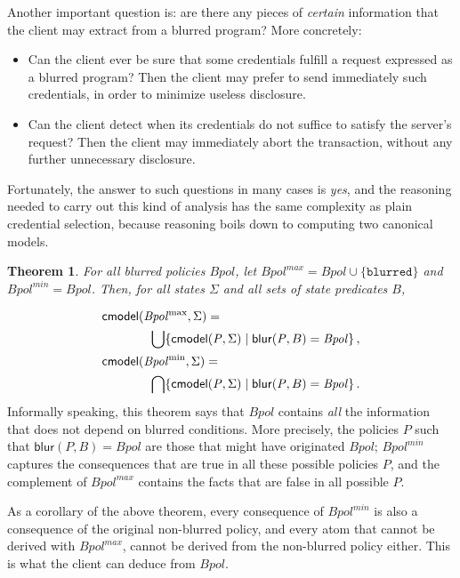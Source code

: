 \documentclass{article}
\newtheorem{theorem}{Theorem}
\newcommand{\m}[1]{\ensuremath{\mathsf{#1}}}
\newcommand{\s}[1]{\ensuremath{\mathtt{#1}}}
\newcommand{\x}[1]{\ensuremath{\mathit{#1}}}
\begin{document}
Another important question is: are there any pieces of \emph{certain}
information that the client may extract from a blurred program?  More
concretely:
\begin{itemize}
\item Can the client ever be sure that some credentials
fulfill a request expressed as a blurred program?  Then the client
may prefer to send immediately such credentials, in order to minimize
useless disclosure.

\item Can the client detect when its credentials do not suffice to
satisfy the server's request?  Then the client may immediately abort
the transaction, without any further unnecessary disclosure.
\end{itemize}
Fortunately, the answer to such questions in many cases is \emph{yes},
and the reasoning needed to carry out this kind of analysis has the
same complexity as plain credential selection, because reasoning boils
down to computing two canonical models.

\begin{theorem}                         \label{blurring-ok}
For all blurred policies \x{Bpol}, let \x{Bpol^{\max} = Bpol \cup
\{\s{blurred}\}} and \x{Bpol^{\min} = Bpol}.  Then, for all states
$\Sigma$ and all sets of state predicates $B$,
\end{theorem}
\begin{eqnarray*}
\m{cmodel} \lefteqn{  (\x{Bpol^{\max}},\Sigma) =  }\\
& & \bigcup \{ \m{cmodel}(\x{P},\Sigma) \mid 
\m{blur}(\x{P},B) =  \x{Bpol} \} \,,
\nonumber
\\
\m{cmodel} \lefteqn{  (\x{Bpol^{\min}},\Sigma) =  }\\
& & \bigcap \{ \m{cmodel}(\x{P},\Sigma) \mid 
\m{blur}(\x{P},B) =  \x{Bpol} \} \,.
\nonumber
\end{eqnarray*}
Informally speaking, this theorem says that \x{Bpol} contains
\emph{all} the information that does not depend on blurred conditions.
More precisely, the policies $P$ such that $\m{blur}(\x{P},B) =
\x{Bpol}$ are those that might have originated \x{Bpol};
\x{Bpol^{\min}} captures the consequences that are true in all these
possible policies $P$, and the complement of \x{Bpol^{\max}} contains
the facts that are false in all possible $P$.

As a corollary of the above theorem, every consequence of
\x{Bpol^{\min}} is also a consequence of the original non-blurred
policy, and every atom that cannot be derived with \x{Bpol^{\max}},
cannot be derived from the non-blurred policy either.  This is what
the client can deduce from \x{Bpol}.
\end{document}
